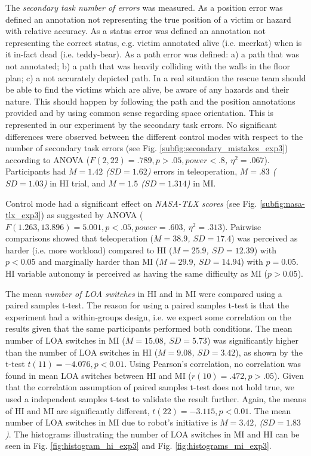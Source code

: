 \documentclass[a4paper,12pt,oneside,openright]{bhamthesis}
\begin{document}
The \textit{secondary task number of errors} was measured. As a position error was defined an annotation not representing the true position of a victim or hazard with relative accuracy. As a status error was defined an annotation not representing the correct status, e.g. victim annotated alive (i.e. meerkat) when is it in-fact dead (i.e. teddy-bear). As a path error was defined: a) a path that was not annotated; b) a path that was heavily colliding with the walls in the floor plan; c) a not accurately depicted path. In a real situation the rescue team should be able to find the victims which are alive, be aware of any hazards and their nature. This should happen by following the path and the position annotations provided and by using common sense regarding space orientation. This is represented in our experiment by the secondary task errors. No significant differences were observed between the different control modes with respect to the number of secondary task errors (see Fig. \ref{subfig:secondary_mistakes_exp3}) according to ANOVA (\textit{$F(2,22) = .789, p > .05 , power < .8$, $\eta^2 = .067$}). Participants had \textit{$M = 1.42$ ($SD = 1.62$)} errors in teleoperation, \textit{$M = .83$ ($SD = 1.03$)} in HI trial, and \textit{$M = 1.5$ ($SD = 1.314$)} in MI.

Control mode had a significant effect on \textit{NASA-TLX scores} (see Fig. \ref{subfig:nasa-tlx_exp3}) as suggested by ANOVA (\textit{$F(1.263,13.896) = 5.001, p < .05 , power = .603$, $\eta^2 = .313$}). Pairwise comparisons showed that teleoperation (\textit{$M = 38.9$, $SD = 17.4$}) was perceived as harder (i.e. more workload) compared to HI (\textit{$M = 25.9$, $SD = 12.39$}) with $p < 0.05$ and marginally harder than MI (\textit{$M = 29.9$, $SD = 14.94$}) with $p = 0.05$. HI variable autonomy is perceived as having the same difficulty as MI ($p > 0.05$). 


The mean \textit{number of LOA switches} in HI and in MI were compared using a paired samples t-test. The reason for using a paired samples t-test is that the experiment had a within-groups design, i.e. we expect some correlation on the results given that the same participants performed both conditions. The mean number of LOA switches in MI (\textit{$M = 15.08$, $SD = 5.73$}) was significantly higher than the number of LOA switches in HI (\textit{$M = 9.08$, $SD = 3.42$}), as shown by the t-test $t(11) = -4.076 , p < 0.01$. Using Pearson's correlation, no correlation was found in mean LOA switches between HI and MI ($r(10) = .472, p >. 05$). Given that the correlation assumption of paired samples t-test does not hold true, we used a independent samples t-test to validate the result further. Again, the means of HI and MI are significantly different, $t(22) = -3.115 , p < 0.01$. The mean number of LOA switches in MI due to robot's initiative is \textit{$M = 3.42$, ($SD = 1.83$)}. The histograms illustrating the number of LOA switches in MI and HI can be seen in Fig. \ref{fig:histogram_hi_exp3} and Fig. \ref{fig:histograms_mi_exp3}.
\end{document}
